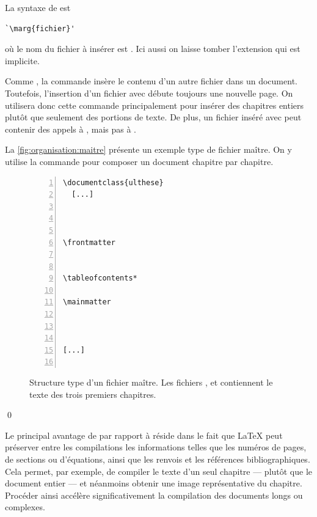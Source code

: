 La syntaxe de \cmd{} est
\begin{lstlisting}
`\marg{fichier}'
\end{lstlisting}
où le nom du fichier à insérer est . Ici
aussi on laisse tomber l'extension  qui est implicite.

Comme \cmd{}, la commande \cmd{} insère le contenu d'un
autre fichier dans un document. Toutefois, l'insertion d'un fichier
avec \cmd{} débute toujours une nouvelle page. On utilisera
donc cette commande principalement pour insérer des chapitres entiers
plutôt que seulement des portions de texte. De plus, un fichier inséré
avec \cmd{} peut contenir des appels à \cmd{}, mais pas
à \cmd{}.

\begin{exemple}
  La \autoref{fig:organisation:maitre} présente un exemple type de
  fichier maître. On y utilise la commande \cmd{} pour
  composer un document chapitre par chapitre.

  \begin{figure}
    \centering
    \begin{minipage}{0.75\linewidth}
\begin{lstlisting}[numbers=left, numberstyle=\tiny,
                   frame=single, rulecolor=\color{black}, framesep=6pt]
\documentclass{ulthese}
  [...]



\frontmatter


\tableofcontents*

\mainmatter



[...]


\end{lstlisting}
    \end{minipage}
    \caption{Structure type d'un fichier maître. Les fichiers
      ,  et 
      contiennent le texte des trois premiers chapitres.}
    \label{fig:organisation:maitre}
  \end{figure}
  \qed
\end{exemple}

Le principal avantage de \cmd{} par rapport à \cmd{}
réside dans le fait que {\LaTeX} peut préserver entre les compilations
les informations telles que les numéros de pages, de sections ou
d'équations, ainsi que les renvois et les références bibliographiques.
Cela permet, par exemple, de compiler le texte d'un seul chapitre ---
plutôt que le document entier --- et néanmoins obtenir une image
représentative du chapitre. Procéder ainsi accélère significativement
la compilation des documents longs ou complexes.

